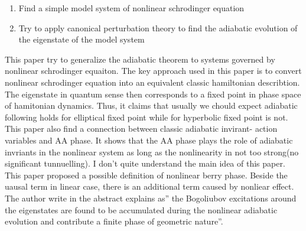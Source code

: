 \documentclass[fontsize=11pt, %
                             paper=a4, %
                             twoside, %
                             captions=tableheading,
                             index=totoc,
                             hyperref]{labbook}
\begin{document}
\begin{addmargin}[4cm]{0cm}
\begin{enumerate}
\item
Find a simple model system of nonlinear schrodinger equation
\item
Try to apply canonical perturbation theory to find the adiabatic evolution of the eigenstate of the model system
\end{enumerate}
This paper try to generalize the adiabatic theorem to systems governed by  nonlinear schrodinger equaiton. The key approach used in this paper is to convert nonlinear schrodinger equation into an equivalent classic hamiltonian describtion. The eigenstate in quantum sense then corresponds to a fixed point in phase space of hamitonian dynamics. Thus, it claims that usually we chould expect adiabatic following holds for elliptical fixed point while for hyperbolic fixed point is not. \\
This paper also find a connection between classic adiabatic invirant- action variables and AA phase. It shows that the AA phase plays the role of adiabatic invriants in the nonlinear system as long as the nonlinearity in not too strong(no significant tunnuelling).
I don't quite understand the main idea of this paper. This paper proposed a possible definition of nonlinear berry phase. Beside the uausal term in linear case, there is an additional term caused by nonliear effect. The author write in the abstract explains as'' the Bogoliubov excitations around the eigenstates are found to be accumulated during the nonlinear adiabatic evolution and contribute a finite phase of geometric nature''.


\end{addmargin}
\end{document}
